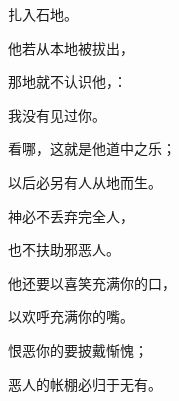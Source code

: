{\par }{\Q 扎入石地。
\par }{\Q {}他若从本地被拔出，
\par }{\Q 那地就不认识他，{}：
\par }{\Q 我没有见过你。
\par }{\Q {}看哪，这就是他道中之乐；
\par }{\Q 以后必另有人从地而生。
\par }{\Q {}神必不丢弃完全人，
\par }{\Q 也不扶助邪恶人。
\par }{\Q {}他还要以喜笑充满你的口，
\par }{\Q 以欢呼充满你的嘴。
\par }{\Q {}恨恶你的要披戴惭愧；
\par }{\Q 恶人的帐棚必归于无有。

}
